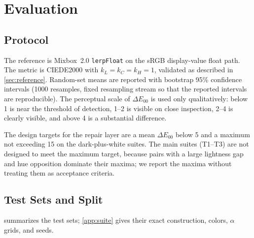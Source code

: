 \section{Evaluation}
\label{sec:evaluation}

\subsection{Protocol}
\label{sec:protocol}

The reference is Mixbox~2.0 \texttt{lerpFloat} on the sRGB display-value float path. The metric is CIEDE2000 with $k_{L}=k_{C}=k_{H}=1$, validated as described in \cref{sec:reference}. Random-set means are reported with bootstrap 95\% confidence intervals (1000 resamples, fixed resampling stream so that the reported intervals are reproducible). The perceptual scale of $\Delta E_{00}$ is used only qualitatively: below 1 is near the threshold of detection, 1--2 is visible on close inspection, 2--4 is clearly visible, and above 4 is a substantial difference.

The design targets for the repair layer are a mean $\Delta E_{00}$ below 5 and a maximum not exceeding 15 on the dark-plus-white suites. The main suites (T1--T3) are not designed to meet the maximum target, because pairs with a large lightness gap and hue opposition dominate their maxima; we report the maxima without treating them as acceptance criteria.

\subsection{Test Sets and Split}
\label{sec:sets}

 summarizes the test sets; \cref{app:suite} gives their exact construction, colors, $\alpha$ grids, and seeds.


